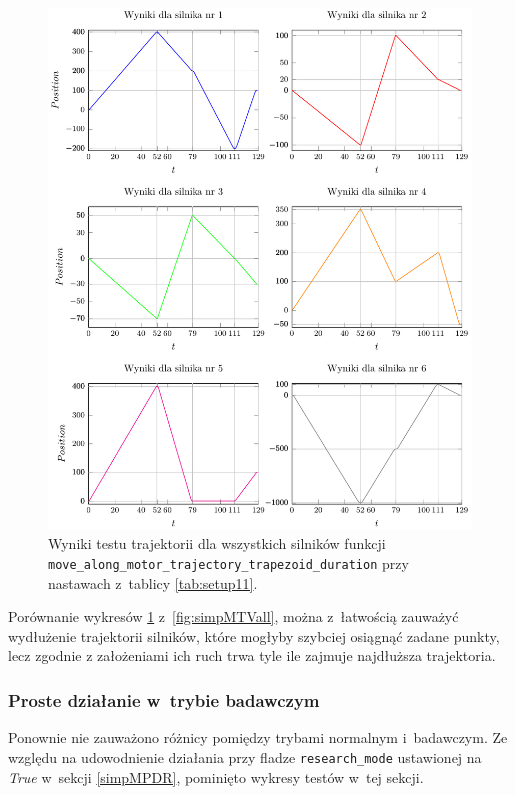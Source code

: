 \documentclass[a4paper, 12pt]{article}
\begin{document}
	\begin{figure}[H]
		\centering
		\includegraphics[scale=1.05]{raport_graphs/simpMTDall.pdf}
		\caption{Wyniki testu trajektorii dla wszystkich silników funkcji \texttt{move\_along\_motor\_trajectory\_trapezoid\_duration} przy nastawach z~tablicy \ref{tab:setup11}.}
		\label{fig:simpMTDall}
	\end{figure}
	
	Porównanie wykresów \ref{fig:simpMTDall} z~\ref{fig:simpMTVall}, można z~łatwością zauważyć wydłużenie trajektorii silników, które mogłyby szybciej osiągnąć zadane punkty, lecz zgodnie z założeniami ich ruch trwa tyle ile zajmuje najdłuższa trajektoria.
	
	\subsubsection{Proste działanie w~trybie badawczym}	
	Ponownie nie zauważono różnicy pomiędzy trybami normalnym i~badawczym. Ze względu na udowodnienie działania przy fladze \texttt{research\_mode} ustawionej na \textit{True} w~sekcji \ref{simpMPDR}, pominięto wykresy testów w~tej sekcji.
	
\end{document}
